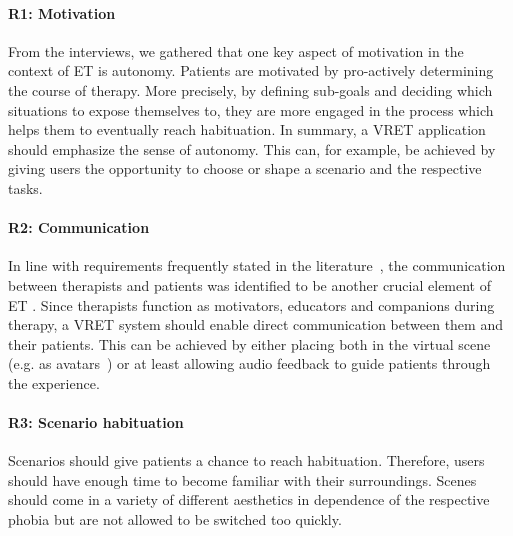 
\paragraph{R1: Motivation} 
From the interviews, we gathered that one key aspect of motivation in the context of \ac{ET} %
is autonomy. Patients are motivated by pro-actively determining the course of therapy. More precisely, by defining sub-goals and deciding which situations to expose themselves to, they are more engaged in the process which helps them to eventually reach habituation. In summary, a \ac{VRET} application should emphasize the sense of autonomy. This can, for example, be achieved by giving users the opportunity to choose or shape a scenario and the respective tasks.

\paragraph{R2: Communication} In line with requirements frequently stated in the literature~\cite{cheek2015,fleming2016}, the communication between therapists and patients was identified to be another crucial element of \ac{ET}%
. Since therapists function as motivators, educators and companions during therapy, a \ac{VRET} system should enable direct communication between them and their patients. This can be achieved by either placing both in the virtual scene (e.g. as avatars~\cite{freeman2018,koller2019}) or at least allowing audio feedback to guide patients through the experience.

\paragraph{R3: Scenario habituation} 
Scenarios should give patients a chance to reach habituation. Therefore, users should have enough time to become familiar with their surroundings. Scenes should come in a variety of different aesthetics in dependence of the respective phobia but are not allowed to be switched too quickly. 

